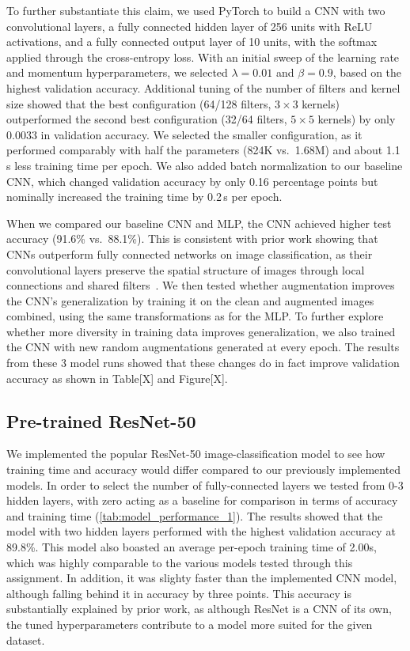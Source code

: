 \documentclass[11pt]{article}
\begin{document}
To further substantiate this claim, we used PyTorch to build a CNN with two convolutional layers,
a fully connected hidden layer of 256 units with ReLU activations, and a fully connected output layer
of 10 units, with the softmax applied through the cross-entropy loss. With an initial sweep of the learning 
rate and momentum hyperparameters, we selected $\lambda = 0.01$ and $\beta = 0.9$, based on the highest validation accuracy. 
Additional tuning of the number of filters and kernel size showed that the best configuration 
(64/128 filters, $3\times3$ kernels) outperformed the second best configuration (32/64 filters,
$5\times5$ kernels) by only 0.0033 in validation accuracy. We selected the smaller configuration, 
as it performed comparably with half the parameters (824K vs.\ 1.68M) and about 1.1\,s less training time per epoch. 
We also added batch normalization to our baseline CNN, which changed validation accuracy by only 0.16 percentage 
points but nominally increased the training time by 0.2\,s per epoch. 

When we compared our baseline CNN and MLP, the CNN achieved higher test accuracy (91.6\% vs.\ 88.1\%). 
This is consistent with prior work showing that CNNs outperform fully connected networks on image
classification, as their convolutional layers preserve the spatial structure of images through 
local connections and shared filters~\cite[Ch.~9]{Goodfellow-et-al-2016}. We then tested whether 
augmentation improves the CNN's generalization by training it on the clean and augmented images 
combined, using the same transformations as for the MLP. To further explore whether more diversity
in training data improves generalization, we also trained the CNN with new 
random augmentations generated at every epoch. The results from these 3 model runs showed that these 
changes do in fact improve validation accuracy as shown in Table[X] and Figure[X].

\subsection{Pre-trained ResNet-50}
We implemented the popular ResNet-50 image-classification model to see how training time and accuracy would differ compared to our previously implemented models. In order to select the number of fully-connected layers we tested from 0-3 hidden layers, with zero acting as a baseline for comparison in terms of accuracy and training time (\ref{tab:model_performance_1}). The results showed that the model with two hidden layers performed with the highest validation accuracy at 89.8\%. This model also boasted an average per-epoch training time of 2.00s, which was highly comparable to the various models tested through this assignment. In addition, it was slighty faster than the implemented CNN model, although falling behind it in accuracy by three points. This accuracy is substantially explained by prior work, as although ResNet is a CNN of its own, the tuned hyperparameters contribute to a model more suited for the given dataset.
\end{document}
